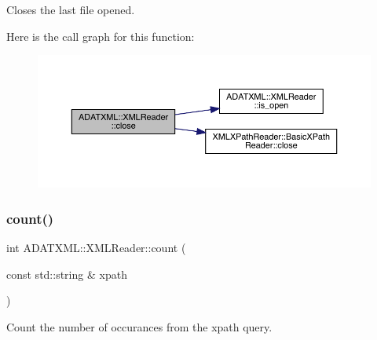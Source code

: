 Closes the last file opened. 

Here is the call graph for this function\+:
\nopagebreak
\begin{figure}[H]
\begin{center}
\leavevmode
\includegraphics[width=350pt]{db/d3f/classADATXML_1_1XMLReader_a0e5f84d85bb03e1ba3c01a20b1642a36_cgraph}
\end{center}
\end{figure}
\mbox{\label{classADATXML_1_1XMLReader_a59584913f1338d956de60adef16a0718}} 
\subsubsection{\texorpdfstring{count()}{count()}\hspace{0.1cm}{\footnotesize\ttfamily [1/2]}}
{\footnotesize\ttfamily int A\+D\+A\+T\+X\+M\+L\+::\+X\+M\+L\+Reader\+::count (\begin{DoxyParamCaption}\item[{const std\+::string \&}]{xpath }\end{DoxyParamCaption})}



Count the number of occurances from the xpath query. 

